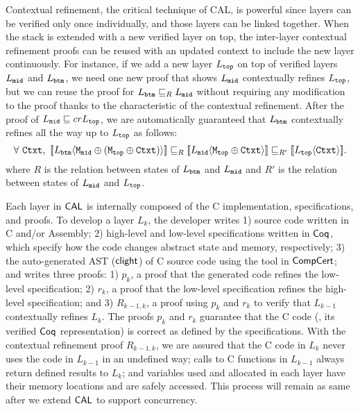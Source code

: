 Contextual refinement, the critical technique of CAL, is powerful since layers can be verified only once individually, and those layers can be linked together.
 When the stack is extended with a new verified layer on top, 
 the inter-layer contextual refinement proofs can be reused with an updated context to include the new layer continuously. 
For instance, if we add a new layer $L_{{\mathrm{\texttt{top}}}}$ on top of verified layers $L_{{\mathrm{\texttt{mid}}}}$ and $L_{{\mathrm{\texttt{btm}}}}$, 
we need one new proof that shows $L_{{\mathrm{\texttt{mid}}}}$ contextually refines $L_{{\mathrm{\texttt{top}}}}$, but we can reuse the proof for $L_{{\mathrm{\texttt{btm}}}} \sqsubseteq_{R} L_{{\mathrm{\texttt{mid}}}}$ without requiring any modification to the proof thanks to the characteristic of the contextual refinement. After the proof of $L_{{\mathrm{\texttt{mid}}}} \sqsubseteq{cr} L_{{\mathrm{\texttt{top}}}}$, we are automatically guaranteed that $L_{{\mathrm{\texttt{btm}}}}$ contextually refines all the way up to $L_{{\mathrm{\texttt{top}}}}$ as follows:
$$
\forall\ \codeinmath{Ctxt},\ \sem{L_{\codeinmath{btm}}}{\codeinmath{M}_{\codeinmath{mid}}\oplus (\codeinmath{M}_{\codeinmath{top}}\oplus \codeinmath{Ctxt})} \refines_{R}  \sem{L_{\codeinmath{mid}}}{\codeinmath{M}_{\codeinmath{top}} \oplus \codeinmath{Ctxt}} \refines_{R'} \sem{L_{\codeinmath{top}}}{\codeinmath{Ctxt}}. 
$$ 
where $R$ is the relation between states of $ L_{{\mathrm{\texttt{btm}}}}$ and $L_{{\mathrm{\texttt{mid}}}}$ and $R'$ is the relation between states of 
 $ L_{{\mathrm{\texttt{mid}}}}$ and $L_{{\mathrm{\texttt{top}}}}$.


Each layer in $\mathsf{CAL}$ is internally composed of the C implementation, specifications, and proofs.
To develop a layer $L_k$, 
the developer writes 
1) source code written in C and/or Assembly; 
2) high-level and  low-level specifications written in $\mathsf{Coq}$, which specify how the code changes abstract state and memory, respectively; 
3) the auto-generated AST ($\mathsf{clight}$) of C source code using the tool in $\mathsf{CompCert}$; 
and writes three proofs: 
1) $p_k$, a proof that the generated code refines the low-level specification; 
2) $r_k$, a proof that the low-level specification refines the high-level specification; and 
3) $R_{k-1,k}$, a proof using $p_k$ and $r_k$ to verify that $L_{k-1}$ contextually refines $L_{k}$. 
The proofs $p_k$ and $r_k$ guarantee that the C code (\ie , its verified $\mathsf{Coq}$ representation) is correct as defined by the specifications.
 With the contextual refinement proof $R_{k-1, k}$, we are assured that the C code in $L_k$ never uses the code in $L_{k-1}$ in an undefined way; 
 calls to C functions in $L_{k-1}$ always return defined results to $L_k$; and variables 
 used and allocated in each layer have their memory locations and are safely accessed.
 This process will remain as same after we extend $\mathsf{CAL}$ to support concurrency.

